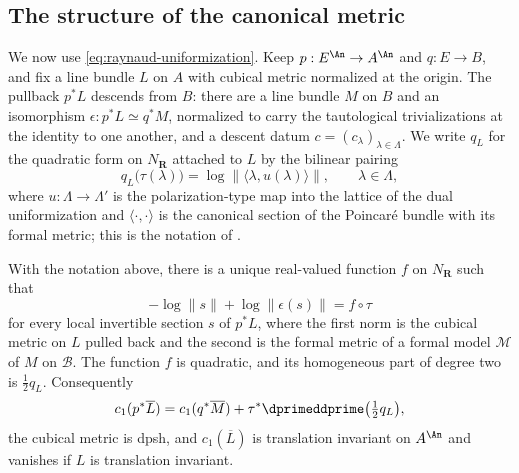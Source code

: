 \subsection{The structure of the canonical metric}
\label{sec:ch19-canonical-structure}

We now use \eqref{eq:raynaud-uniformization}.  Keep
$p:E^{\An}\to A^{\An}$ and $q:E\to B$, and fix a line bundle $L$ on
$A$ with cubical metric normalized at the origin.  The pullback
$p^*L$ descends from $B$: there are a line bundle $M$ on $B$ and an
isomorphism $\epsilon:p^*L\simeq q^*M$, normalized to carry the
tautological trivializations at the identity to one another, and a descent
datum $c=(c_\lambda)_{\lambda\in\Lambda}$.  We write $q_L$ for the
quadratic form on $N_{\mathbf R}$ attached to $L$ by the bilinear
pairing
\begin{equation}
\label{eq:ch19-qL}
 q_L\bigl(\tau(\lambda)\bigr)=\log\bigl\|\langle\lambda,u(\lambda)\rangle\bigr\| ,
 \qquad \lambda\in\Lambda,
\end{equation}
where $u:\Lambda\to\Lambda'$ is the polarization-type map into the lattice
of the dual uniformization and $\langle\cdot,\cdot\rangle$ is the
canonical section of the Poincar\'e bundle with its formal metric; this is
the notation of \cite[\S B.6.3]{CLD25}.

\begin{theorem}
\label{thm:ch19-canonical-structure}
With the notation above, there is a unique real-valued function $f$ on
$N_{\mathbf R}$ such that
\begin{equation}
\label{eq:ch19-canonical-weight}
 -\log\|s\|+\log\|\epsilon(s)\|=f\circ\tau
\end{equation}
for every local invertible section $s$ of $p^*L$, where the first norm
is the cubical metric on $L$ pulled back and the second is the formal
metric of a formal model $\mathcal M$ of $M$ on $\mathcal B$.  The
function $f$ is quadratic, and its homogeneous part of degree two is
$\tfrac12q_L$.  Consequently
\begin{equation}
\label{eq:ch19-canonical-curvature}
 c_1(p^*\overline L)=c_1(q^*\overline M)
   +\tau^*\dprimeddprime\bigl(\tfrac12q_L\bigr),
\end{equation}
the cubical metric is dpsh, and $c_1(\overline L)$ is translation
invariant on $A^{\An}$ and vanishes if $L$ is translation invariant.
\end{theorem}

